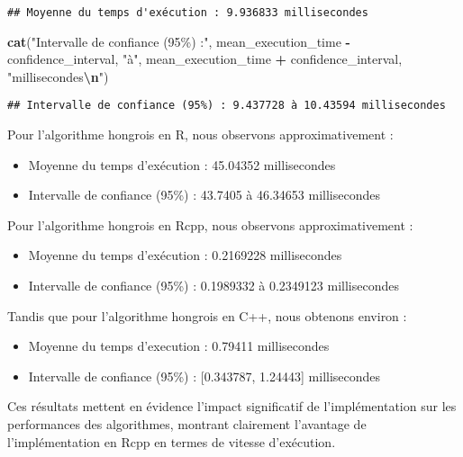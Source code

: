 \documentclass[
]{article}
\newenvironment{Shaded}{\begin{snugshade}}{\end{snugshade}}
\newcommand{\FunctionTok}[1]{\textcolor[rgb]{0.13,0.29,0.53}{\textbf{#1}}}
\newcommand{\NormalTok}[1]{#1}
\newcommand{\SpecialCharTok}[1]{\textcolor[rgb]{0.81,0.36,0.00}{\textbf{#1}}}
\newcommand{\StringTok}[1]{\textcolor[rgb]{0.31,0.60,0.02}{#1}}
\providecommand{\tightlist}{%
  \setlength{\itemsep}{0pt}\setlength{\parskip}{0pt}}
\begin{document}
\begin{verbatim}
## Moyenne du temps d'exécution : 9.936833 millisecondes
\end{verbatim}

\begin{Shaded}
\begin{Highlighting}[]
\FunctionTok{cat}\NormalTok{(}\StringTok{"Intervalle de confiance (95\%) :"}\NormalTok{, mean\_execution\_time }\SpecialCharTok{{-}}\NormalTok{ confidence\_interval,}
    \StringTok{"à"}\NormalTok{, mean\_execution\_time }\SpecialCharTok{+}\NormalTok{ confidence\_interval, }\StringTok{"millisecondes}\SpecialCharTok{\textbackslash{}n}\StringTok{"}\NormalTok{)}
\end{Highlighting}
\end{Shaded}

\begin{verbatim}
## Intervalle de confiance (95%) : 9.437728 à 10.43594 millisecondes
\end{verbatim}

Pour l'algorithme hongrois en R, nous observons approximativement :

\begin{itemize}
\tightlist
\item
  Moyenne du temps d'exécution : 45.04352 millisecondes
\item
  Intervalle de confiance (95\%) : 43.7405 à 46.34653 millisecondes
\end{itemize}

Pour l'algorithme hongrois en Rcpp, nous observons approximativement :

\begin{itemize}
\tightlist
\item
  Moyenne du temps d'exécution : 0.2169228 millisecondes
\item
  Intervalle de confiance (95\%) : 0.1989332 à 0.2349123 millisecondes
\end{itemize}

Tandis que pour l'algorithme hongrois en C++, nous obtenons environ :

\begin{itemize}
\tightlist
\item
  Moyenne du temps d'execution : 0.79411 millisecondes
\item
  Intervalle de confiance (95\%) : {[}0.343787, 1.24443{]} millisecondes
\end{itemize}

Ces résultats mettent en évidence l'impact significatif de
l'implémentation sur les performances des algorithmes, montrant
clairement l'avantage de l'implémentation en Rcpp en termes de vitesse
d'exécution.
\end{document}
